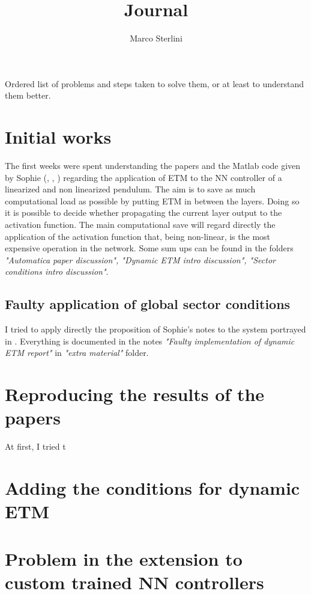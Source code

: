 \documentclass{article}
\begin{document}
\date{}
\author{Marco Sterlini}

\title{Journal}
\maketitle

Ordered list of problems and steps taken to solve them, or at least to understand them better.

\section*{Initial works}

The first weeks were spent understanding the papers and the Matlab code given by Sophie (\cite{automatica}, \cite{css-paper}, \cite{data-driven}) regarding the application of ETM to the NN controller of a linearized and non linearized pendulum. The aim is to save as much computational load as possible by putting ETM in between the layers. Doing so it is possible to decide whether propagating the current layer output to the activation function. 
The main computational save will regard directly the application of the activation function that, being non-linear, is the most expensive operation in the network.
Some sum ups can be found in the folders \textit{"Automatica paper discussion", "Dynamic ETM intro discussion", "Sector conditions intro discussion"}.

\subsection*{Faulty application of global sector conditions}

I tried to apply directly the proposition of Sophie's notes to the system portrayed in \cite{css-paper}. Everything is documented in the notes \textit{"Faulty implementation of dynamic ETM report"} in \textit{"extra material"} folder.

\section*{Reproducing the results of the papers}
At first, I tried t

\section*{Adding the conditions for dynamic ETM}

\section*{Problem in the extension to custom trained NN controllers}
\end{document}

